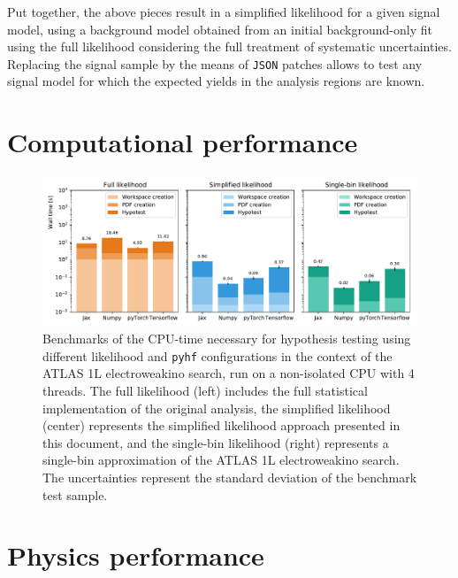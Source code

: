 Put together, the above pieces result in a simplified likelihood for a given signal model, using a background model obtained from an initial background-only fit using the full likelihood considering the full treatment of systematic uncertainties. Replacing the signal sample by the means of \texttt{JSON} patches allows to test any signal model for which the expected yields in the analysis regions are known.  

\section{Computational performance}\label{sec:cpu_performance}

\begin{figure}
	\centering    
	\includegraphics[width=\textwidth]{benchmark_1Lbb}
	\caption{Benchmarks of the CPU-time necessary for hypothesis testing using different likelihood and \texttt{pyhf} configurations in the context of the ATLAS 1L electroweakino search, run on a non-isolated CPU with 4 threads. The full likelihood (left) includes the full statistical implementation of the original analysis, the simplified likelihood (center) represents the simplified likelihood approach presented in this document, and the single-bin likelihood (right) represents a single-bin approximation of the ATLAS 1L electroweakino search. The uncertainties represent the standard deviation of the benchmark test sample.}\label{fig:benchmark}
	\label{fig:benchmark_1Lbb}
\end{figure}


\section{Physics performance}\label{sec:physics_performance}
